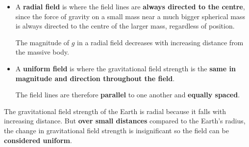 \begin{itemize}
    \item A \textbf{radial field} is where the field lines are \textbf{always directed to the centre}, since the force of gravity on a small mass near a much bigger spherical mass is always directed to the centre of the larger mass, regardless of position.

        The magnitude of $g$ in a radial field decreases with increasing distance from the massive body.
    \item A \textbf{uniform field} is where the gravitational field strength is the \textbf{same in magnitude and direction throughout the field}.

        The field lines are therefore \textbf{parallel} to one another and \textbf{equally spaced}.
\end{itemize}

The gravitational field strength of the Earth is radial because it falls with increasing distance. But \textbf{over small distances} compared to the Earth's radius, the change in gravitational field strength is insignificant so the field can be \textbf{considered uniform}.
